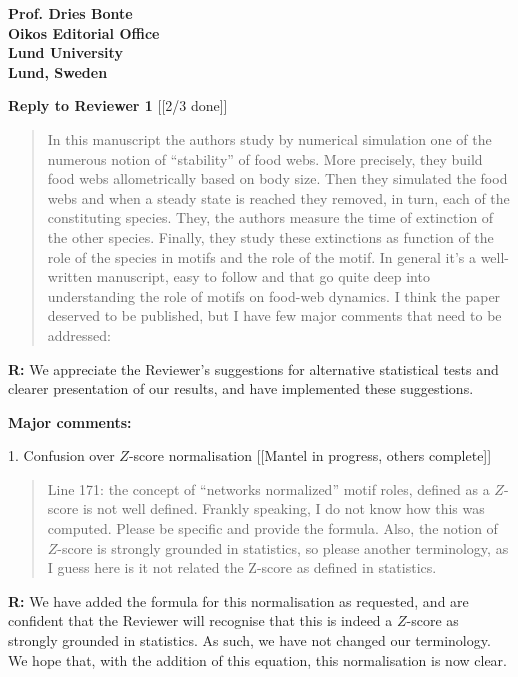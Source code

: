 \documentclass[12pt]{letter}
\begin{document}
\begin{letter}{\bf Prof. Dries Bonte\\
Oikos Editorial Office \\
Lund University \\
Lund, Sweden}
\clearpage

{\large\textbf{Reply to Reviewer 1}} [[2/3 done]]

  \begin{quotation}

    In this manuscript the authors study by numerical simulation one of the numerous notion of “stability” of food webs. More precisely, they build food webs allometrically based on body size. Then they simulated the food webs and when a steady state is reached they removed, in turn, each of the constituting species. They, the authors measure the time of extinction of the other species. Finally, they study these extinctions as function of the role of the species in motifs and the role of the motif. In general it’s a well-written manuscript, easy to follow and that go quite deep into understanding the role of motifs on food-web dynamics. I think the paper deserved to be published, but I have few major comments that need to be addressed:

  \end{quotation}

  \textbf{R:} We appreciate the Reviewer's suggestions for alternative statistical tests and clearer presentation of our results, and have implemented these suggestions.

  \smallskip

  \textbf{Major comments:}

    1. Confusion over $Z$-score normalisation [[Mantel in progress, others complete]]

      \begin{quotation}
        Line 171: the concept of “networks normalized” motif roles, defined as a $Z$-score is not well defined. Frankly speaking, I do not know how this was computed. Please be specific and provide the formula. Also, the notion of $Z$-score is strongly grounded in statistics, so please another terminology, as I guess here is it not related the Z-score as defined in statistics.
      \end{quotation}

      \smallskip

      \textbf{R:} We have added the formula for this normalisation as requested, and are confident that the Reviewer will recognise that this is indeed a $Z$-score as strongly grounded in statistics. As such, we have not changed our terminology. We hope that, with the addition of this equation, this normalisation is now clear.


\end{letter}
\end{document}
